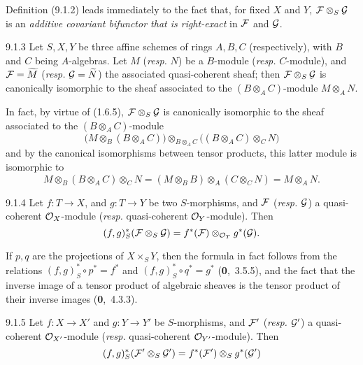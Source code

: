 \documentclass[../main.tex]{subfiles}
\begin{document}
Definition (9.1.2) leads immediately to the fact that, for fixed $X$ and $Y$, $\mathcal{F}\otimes_S\mathcal{G}$ is an \emph{additive covariant bifunctor that is right-exact} in $\mathcal{F}$ and $\mathcal{G}$.

\begin{env}[Proposition]{9.1.3}
    Let $S,X,Y$ be three affine schemes of rings $A,B,C$ (respectively), with $B$ and $C$ being $A$-algebras.
    Let $M$ (\emph{resp.} $N$) be a $B$-module (\emph{resp.} $C$-module), and $\mathcal{F}=\widetilde{M}$ (\emph{resp.} $\mathcal{G}=\widetilde{N}$) the associated quasi-coherent sheaf; then $\mathcal{F}\otimes_S\mathcal{G}$ is canonically isomorphic to the sheaf associated to the $(B\otimes_A C)$-module $M\otimes_A N$.
\end{env}

In fact, by virtue of (1.6.5), $\mathcal{F}\otimes_S\mathcal{G}$ is canonically isomorphic to the sheaf associated to the $(B\otimes_A C)$-module
\begin{equation*}
    \big( M\otimes_B(B\otimes_A C) \big) \otimes_{B\otimes_A C} \big( (B\otimes_A C)\otimes_C N \big)
\end{equation*}
and by the canonical isomorphisms between tensor products, this latter module is isomorphic to
\begin{equation*}
    M\otimes_B(B\otimes_A C)\otimes_C N = (M\otimes_B B)\otimes_A(C\otimes_C N) = M\otimes_A N.
\end{equation*}

\begin{env}[Proposition]{9.1.4}
    Let $f\colon T\to X$, and $g\colon T\to Y$ be two $S$-morphisms, and $\mathcal{F}$ (\emph{resp.} $\mathcal{G}$) a quasi-coherent $\mathcal{O}_X$-module (\emph{resp.} quasi-coherent $\mathcal{O}_Y$-module).
    Then
    \begin{equation*}
        (f,g)^*_S(\mathcal{F}\otimes_S\mathcal{G}) = f^*(\mathcal{F})\otimes_{\mathcal{O}_T}g^*(\mathcal{G}).
    \end{equation*}
\end{env}

If $p,q$ are the projections of $X\times_S Y$, then the formula in fact follows from the relations $(f,g)^*_S\circ p^*=f^*$ and $(f,g)^*_S\circ q^*=g^*$ (\textbf{0},~3.5.5), and the fact that the inverse image of a tensor product of algebraic sheaves is the tensor product of their inverse images (\textbf{0},~4.3.3).

\begin{env}[Corollary]{9.1.5}
    Let $f\colon X\to X'$ and $g\colon Y\to Y'$ be $S$-morphisms, and $\mathcal{F}'$ (\emph{resp.} $\mathcal{G}'$) a quasi-coherent $\mathcal{O}_{X'}$-module (\emph{resp.} quasi-coherent $\mathcal{O}_{Y'}$-module).
    Then
    \begin{equation*}
        (f,g)^*_S(\mathcal{F}'\otimes_S\mathcal{G}') = f^*(\mathcal{F}')\otimes_S g^*(\mathcal{G}')
    \end{equation*}
\end{env}
\end{document}
